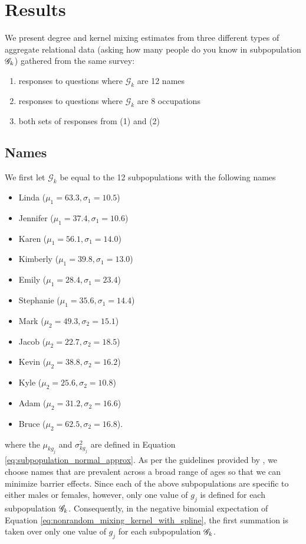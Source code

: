 \section{Results}
\label{sec:kernel_results}

We present degree and kernel mixing estimates from three different types of aggregate relational data (asking how many people do you know in subpopulation $\mathcal{G}_k$) gathered from the same survey:
\begin{enumerate}
\item responses to questions where $\mathcal{G}_k$ are 12 names
\item responses to questions where $\mathcal{G}_k$ are 8 occupations
\item both sets of responses from (1) and (2)
\end{enumerate}

\subsection{Names}
\label{sec:kernel_results_names}

We first let $\mathcal{G}_k$ be equal to the 12 subpopulations with the following names
\begin{itemize}
\item Linda ($\mu_1 = 63.3, \sigma_1 = 10.5$)
\item Jennifer ($\mu_1 = 37.4, \sigma_1 = 10.6$)
\item Karen ($\mu_1 = 56.1, \sigma_1 = 14.0$)
\item Kimberly ($\mu_1 = 39.8, \sigma_1 = 13.0$)
\item Emily ($\mu_1 = 28.4, \sigma_1 = 23.4$)
\item Stephanie ($\mu_1 = 35.6, \sigma_1 = 14.4$)
\item Mark ($\mu_2 = 49.3, \sigma_2 = 15.1$)
\item Jacob ($\mu_2 = 22.7, \sigma_2 = 18.5$)
\item Kevin ($\mu_2 = 38.8, \sigma_2 = 16.2$)
\item Kyle ($\mu_2 = 25.6, \sigma_2 = 10.8$)
\item Adam ($\mu_2 = 31.2, \sigma_2 = 16.6$)
\item Bruce ($\mu_2 = 62.5, \sigma_2 = 16.8$).
\end{itemize}
where the $\mu_{kg_j}$ and $\sigma_{kg_j}^2$ are defined in Equation \ref{eq:subpopulation_normal_approx}. As per the guidelines provided by \citet{McCormick+others:2010}, we choose names that are prevalent across a broad range of ages so that we can minimize barrier effects. Since each of the above subpopulations are specific to either males or females, however, only one value of $g_j$ is defined for each subpopulation $\mathcal{G}_k$. Consequently, in the negative binomial expectation of Equation \ref{eq:nonrandom_mixing_kernel_with_spline}, the first summation is taken over only one value of $g_j$ for each subpopulation $\mathcal{G}_k$.

